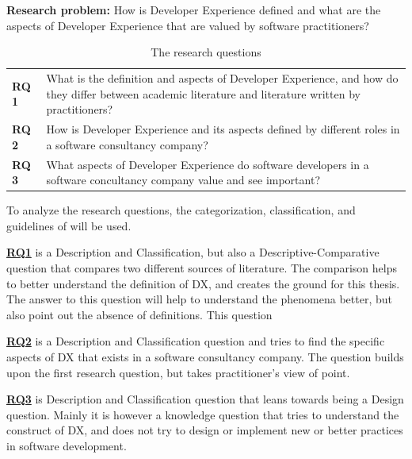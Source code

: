 \documentclass[english, 12pt, a4paper, sci, utf8, a-1b, online]{aaltothesis}
\begin{document}
\newcommand{\researchproblem}{How is Developer Experience defined and what are the aspects of Developer Experience that are valued by software practitioners?}

\textbf{Research problem:} \researchproblem

\newcommand{\rqone}{What is the definition and aspects of Developer Experience, and how do they differ between academic literature and literature written by practitioners?}
\newcommand{\rqtwo}{How is Developer Experience and its aspects defined by different roles in a software consultancy company?}
\newcommand{\rqthree}{What aspects of Developer Experience do software developers in a software concultancy company value and see important?}

\begin{table}[htb]
  \begin{center}
    \begin{tabularx}{\textwidth}{lX}
      \textbf{RQ 1} & \rqone \label{RQ1}   \\
      \textbf{RQ 2} & \rqtwo \label{RQ2}   \\
      \textbf{RQ 3} & \rqthree \label{RQ3}
    \end{tabularx}
  \end{center}
  \caption{The research questions \label{researchquestions}}
\end{table}

To analyze the research questions, the categorization, classification, and guidelines of \cite{easterbrook2008selecting} will be used.

\textbf{\hyperref[RQ1]{RQ1}} is a Description and Classification, but also a Descriptive-Comparative question that compares two different sources of literature. The comparison helps to better understand the definition of DX, and creates the ground for this thesis. The answer to this question will help to understand the phenomena better, but also point out the absence of definitions. This question

\textbf{\hyperref[RQ2]{RQ2}} is a Description and Classification question and tries to find the specific aspects of DX that exists in a software consultancy company. The question builds upon the first research question, but takes practitioner's view of point.

\textbf{\hyperref[RQ3]{RQ3}} is Description and Classification question that leans towards being a Design question. Mainly it is however a knowledge question that tries to understand the construct of DX, and does not try to design or implement new or better practices in software development.
\end{document}
